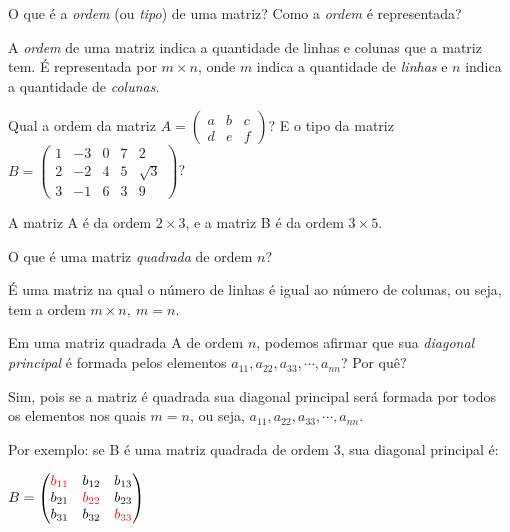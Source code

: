 \documentclass[pdftex, brazil, 12pt, oneside, addpoints]{exam}
\begin{document}
\begin{questions}

\question
O que é a \emph{ordem} (ou \emph{tipo}) de uma matriz? Como a \emph{ordem} é
representada?
\begin{solutionorlines}[0.75in]
  A \emph{ordem} de uma matriz indica a quantidade de linhas e colunas que a matriz
  tem. É representada por $m \times n$, onde $m$ indica a quantidade de \emph{linhas}
  e $n$ indica a quantidade de \emph{colunas}.
\end{solutionorlines}

\question
Qual a ordem da matriz
$A = \begin{pmatrix}
a & b & c\\
d & e & f\end{pmatrix}$? E o tipo da matriz
$B = \begin{pmatrix}
  1 & -3 & 0 & 7 & 2\\
  2 & -2 & 4 & 5 & \sqrt{3}\\
  3 & -1 & 6 & 3 & 9
\end{pmatrix}$?
\begin{solutionorlines}[0.50in]
  A matriz A é da ordem $2 \times 3$, e a matriz B é da ordem $3 \times 5$.
\end{solutionorlines}

\question
O que é uma matriz \emph{quadrada} de ordem $n$?
\begin{solutionorlines}[0.50in]
  É uma matriz na qual o número de linhas é igual ao número de colunas, ou seja,
  tem a ordem $m \times n,\ m = n$.
\end{solutionorlines}

\question
Em uma matriz quadrada A de ordem $n$, podemos afirmar que sua \emph{diagonal
  principal} é formada pelos elementos $a_{11}, a_{22}, a_{33}, \cdots, a_{nn}$? Por quê?
\begin{solutionorlines}[0.75in]
  Sim, pois se a matriz é quadrada sua diagonal principal será formada por todos os
  elementos nos quais $m = n$, ou seja, $a_{11}, a_{22}, a_{33}, \cdots, a_{nn}$.

  Por exemplo: se B é uma matriz quadrada de ordem 3, sua diagonal principal é:

  $B = \begin{pmatrix}
   \color{red} b_{11} & b_{12} & b_{13}\\
   b_{21} & \color{red} b_{22} & b_{23}\\
   b_{31} & b_{32} & \color{red} b_{33}
  \end{pmatrix}$ 
\end{solutionorlines}


\end{questions}
\end{document}
